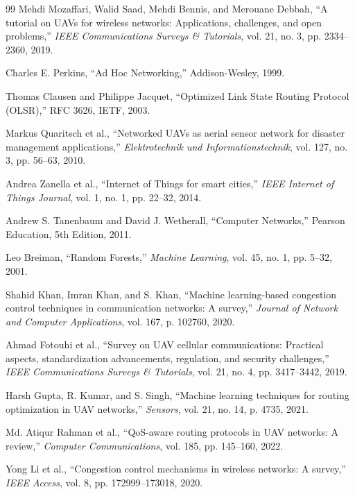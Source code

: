 \begin{thebibliography}{99}
Mehdi Mozaffari, Walid Saad, Mehdi Bennis, and Merouane Debbah,
``A tutorial on UAVs for wireless networks: Applications, challenges, and open problems,''
\textit{IEEE Communications Surveys \& Tutorials},
vol. 21, no. 3, pp. 2334--2360, 2019.

Charles E. Perkins,
``Ad Hoc Networking,''
Addison-Wesley, 1999.

Thomas Clausen and Philippe Jacquet,
``Optimized Link State Routing Protocol (OLSR),''
RFC 3626, IETF, 2003.

Markus Quaritsch et al.,
``Networked UAVs as aerial sensor network for disaster management applications,''
\textit{Elektrotechnik und Informationstechnik},
vol. 127, no. 3, pp. 56--63, 2010.

Andrea Zanella et al.,
``Internet of Things for smart cities,''
\textit{IEEE Internet of Things Journal},
vol. 1, no. 1, pp. 22--32, 2014.

Andrew S. Tanenbaum and David J. Wetherall,
``Computer Networks,''
Pearson Education, 5th Edition, 2011.

Leo Breiman,
``Random Forests,''
\textit{Machine Learning},
vol. 45, no. 1, pp. 5--32, 2001.

Shahid Khan, Imran Khan, and S. Khan,
``Machine learning-based congestion control techniques in communication networks: A survey,''
\textit{Journal of Network and Computer Applications},
vol. 167, p. 102760, 2020.

Ahmad Fotouhi et al.,
``Survey on UAV cellular communications: Practical aspects, standardization advancements, regulation, and security challenges,''
\textit{IEEE Communications Surveys \& Tutorials},
vol. 21, no. 4, pp. 3417--3442, 2019.

Harsh Gupta, R. Kumar, and S. Singh,
``Machine learning techniques for routing optimization in UAV networks,''
\textit{Sensors},
vol. 21, no. 14, p. 4735, 2021.

Md. Atiqur Rahman et al.,
``QoS-aware routing protocols in UAV networks: A review,''
\textit{Computer Communications},
vol. 185, pp. 145--160, 2022.

Yong Li et al.,
``Congestion control mechanisms in wireless networks: A survey,''
\textit{IEEE Access},
vol. 8, pp. 172999--173018, 2020.


\end{thebibliography}
